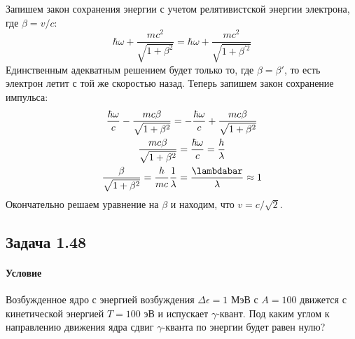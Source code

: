 \documentclass[12pt]{article}
\begin{document}
\vspace{1em} \noindent
Запишем закон сохранения энергии с учетом релятивистской энергии электрона, где $\beta = v/c$:
\begin{equation*}
    \hbar\omega + \dfrac{mc^2}{\sqrt{1+\beta^2}}=\hbar\omega + \dfrac{mc^2}{\sqrt{1+\beta^{'2}}}
\end{equation*}
Единственным адекватным решением будет только то, где $\beta = \beta'$, то есть электрон летит с той же скоростью назад. Теперь запишем закон сохранение импульса:
\begin{gather*}
    \dfrac{\hbar\omega}{c} - \dfrac{mc\beta}{\sqrt{1+\beta^2}} = -\dfrac{\hbar\omega}{c} + \dfrac{mc\beta}{\sqrt{1+\beta^2}}\\
     \dfrac{mc\beta}{\sqrt{1+\beta^2}} = \dfrac{\hbar\omega}{c} = \dfrac{h}{\lambda}\\
     \dfrac{\beta}{\sqrt{1+\beta^2}} = \dfrac{h}{mc}\dfrac{1}{\lambda} = \dfrac{\lambdabar}{\lambda}\approx 1\\
\end{gather*}
Окончательно решаем уравнение на $\beta$ и находим, что $v = c/\sqrt{2}$.

\subsection{Задача 1.48}
\label{task_148}
\paragraph{Условие} Возбужденное ядро с энергией возбуждения $\Delta \epsilon = 1 $ МэВ с $A = 100$ движется с кинетической энергией $T = 100$ эВ и испускает $\gamma$-квант. Под каким углом к направлению движения ядра сдвиг $\gamma$-кванта по энергии будет равен нулю?
\end{document}
